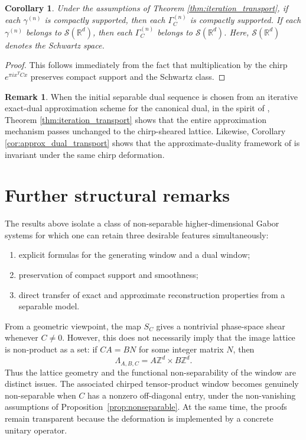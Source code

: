 \documentclass[final,1p,times,authoryear]{elsarticle}
\newtheorem{corollary}[theorem]{Corollary}
\theoremstyle{definition}
\newtheorem{remark}[theorem]{Remark}
\newcommand{\R}{\mathbb{R}}
\newcommand{\1}{\mathbf{1}}
\begin{document}
\begin{corollary}\label{cor:compact_support_iteration}
Under the assumptions of Theorem \ref{thm:iteration_transport}, if each $\gamma^{(n)}$
is compactly supported, then each $\Gamma_C^{(n)}$ is compactly supported.
If each $\gamma^{(n)}$ belongs to $\mathcal S(\R^d)$, then each $\Gamma_C^{(n)}$ belongs to $\mathcal S(\R^d)$. Here, $\mathcal S(\R^d)$ denotes the Schwartz space.
\end{corollary}

\begin{proof}
This follows immediately from the fact that multiplication by the chirp
$e^{\pi i x^TCx}$ preserves compact support and the Schwartz class.
\end{proof}

\begin{remark}
{When the initial separable dual sequence is chosen from an iterative exact-dual approximation scheme
for the canonical dual, in the spirit of \citep{Sto22}, Theorem \ref{thm:iteration_transport} shows that
the entire approximation mechanism passes unchanged to the chirp-sheared lattice. Likewise,
Corollary \ref{cor:approx_dual_transport} shows that the approximate-duality framework of
\citep{CJKK18} is invariant under the same chirp deformation.}
\end{remark}


\section{Further structural remarks}

The results above isolate a class of non-separable higher-dimensional Gabor systems for which one can
retain three desirable features simultaneously:
\begin{enumerate}[label=\textup{(\roman*)}]
    \item explicit formulas for the generating window and a dual window;
    \item preservation of compact support and smoothness;
    \item direct transfer of exact and approximate reconstruction properties from a separable model.
\end{enumerate}

{From a geometric viewpoint, the map $S_C$ gives a nontrivial phase-space shear whenever
$C\neq0$. However, this does not necessarily imply that the image lattice is non-product as a set:
if $CA=BN$ for some integer matrix $N$, then
$$
\Lambda_{A,B,C}=A\mathbb Z^d\times B\mathbb Z^d.
$$
Thus the lattice geometry and the functional non-separability of the window are distinct issues.
The associated chirped tensor-product window becomes genuinely non-separable when $C$ has a
nonzero off-diagonal entry, under the non-vanishing assumptions of
Proposition~\ref{prop:nonseparable}. At the same time, the proofs remain transparent because the
deformation is implemented by a concrete unitary operator.}
\end{document}
